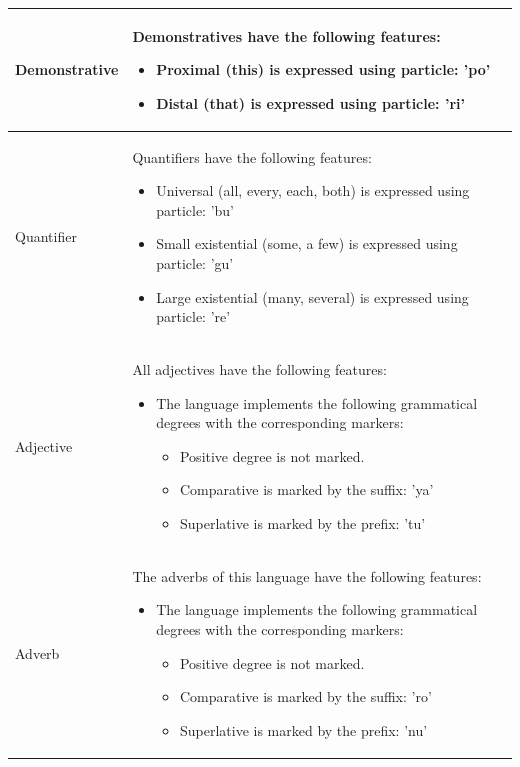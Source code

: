 \begin{longtable}{|l|p{10cm}|}
Demonstrative & Demonstratives have the following features:
\begin{itemize}
    \item Proximal (this) is expressed using particle: 'po'
    \item Distal (that) is expressed using particle: 'ri'
\end{itemize} \\
\hline

Quantifier & Quantifiers have the following features:
\begin{itemize}
    \item Universal (all, every, each, both) is expressed using particle: 'bu'
    \item Small existential (some, a few) is expressed using particle: 'gu'
    \item Large existential (many, several) is expressed using particle: 're'
\end{itemize} \\
\hline

Adjective & All adjectives have the following features:
\begin{itemize}
    \item The language implements the following grammatical degrees with the corresponding markers:
    \begin{itemize}
        \item Positive degree is not marked.
        \item Comparative is marked by the suffix: 'ya'
        \item Superlative is marked by the prefix: 'tu'
    \end{itemize}
\end{itemize} \\
\hline

Adverb & The adverbs of this language have the following features:
\begin{itemize}
    \item The language implements the following grammatical degrees with the corresponding markers:
    \begin{itemize}
        \item Positive degree is not marked.
        \item Comparative is marked by the suffix: 'ro'
        \item Superlative is marked by the prefix: 'nu'
    \end{itemize}
\end{itemize} \\
\hline


\end{longtable}
